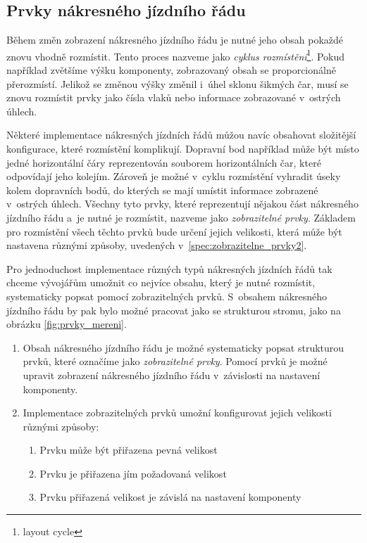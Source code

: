 \newpage
\subsection*{Prvky nákresného jízdního řádu}
\label{kap2:view_elements}
Během změn zobrazení nákresného jízdního řádu je nutné jeho obsah pokaždé znovu vhodně rozmístit. Tento proces nazveme jako \textit{cyklus rozmístění}\footnote{layout cycle}. Pokud například zvětšíme výšku komponenty, zobrazovaný obsah se proporcionálně přerozmístí. Jelikož se změnou výšky změnil i~úhel sklonu šikmých čar, musí se znovu rozmístit prvky jako čísla vlaků nebo informace zobrazované v~ostrých úhlech. 

Některé implementace nákresných jízdních řádů můžou navíc obsahovat složitější konfigurace, které rozmístění komplikují. Dopravní bod například může být místo jedné horizontální čáry reprezentován souborem horizontálních čar, které odpovídají jeho kolejím. Zároveň je možné v~cyklu rozmístění vyhradit úseky kolem dopravních bodů, do kterých se mají umístit informace zobrazené v~ostrých úhlech. Všechny tyto prvky, které reprezentují nějakou část nákresného jízdního řádu a~je nutné je rozmístit, nazveme jako \textit{zobrazitelné prvky}. Základem pro rozmístění všech těchto prvků bude určení jejich velikosti, která může být nastavena různými způsoby, uvedených v~\ref{spec:zobrazitelne_prvky2}.

Pro jednoduchost implementace různých typů nákresných jízdních řádů tak chceme vývojářům umožnit co nejvíce obsahu, který je nutné rozmístit, systematicky popsat pomocí zobrazitelných prvků. S~obsahem nákresného jízdního řádu by pak bylo možné pracovat jako se strukturou stromu, jako na obrázku \ref{fig:prvky_mereni}.

\begin{enumerate}[label=\color{reqcolor}\textbf{R{\arabic*}},resume]
	\item \label{spec:zobrazitelne_prvky1} Obsah nákresného jízdního řádu je možné systematicky popsat strukturou prvků, které označíme jako \textit{zobrazitelné prvky}. Pomocí prvků je možné upravit zobrazení nákresného jízdního řádu v~závislosti na nastavení komponenty.
	\item \label{spec:zobrazitelne_prvky2} Implementace zobrazitelných prvků umožní konfigurovat jejich velikosti různými způsoby:		
\begin{enumerate}
	\item	Prvku může být přiřazena pevná velikost
	\item	Prvku je přiřazena jím požadovaná velikost
	\item	Prvku přiřazená velikost je závislá na nastavení komponenty
\end{enumerate}
 
\end{enumerate}

